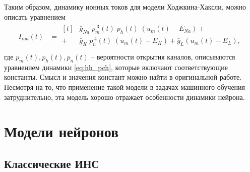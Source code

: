 \documentclass[a4paper,10pt]{article}
\begin{document}
	\indent Таким образом, динамику ионных токов для модели Ходжкина-Хаксли, можно описать уравнением
	\begin{align}\label{eq:hh_ion}
	I_{ion}(t) &= \begin{aligned}[t]
	&\bar{g}_{Na}\;p_{m}^{\;3}(t)\;p_{h}(t)\;(u_{m}(t)-E_{Na}) +	\\
	+\;&\bar{g}_{K}\;p_{n}^{\;4}(t)\;(u_{m}(t)-E_{K})+\bar{g}_{L}(u_{m}(t)-E_{L}),	\\
	\end{aligned}	
	\end{align}
	где $p_{m}(t), p_{h}(t), p_{n}(t)$ -- вероятности открытия каналов, описываются уравнением динамики \eqref{eq:hh_pch}, которые включают соответствующие константы. Смысл и значения констант можно найти в оригинальной работе\cite{HH}.\\
	\indent Несмотря на то, что применение такой модели в задачах машинного обучения затруднительно, эта модель хорошо отражает особенности динамики нейрона.

\section{Модели нейронов}
\subsection{Классические ИНС}
\end{document}
